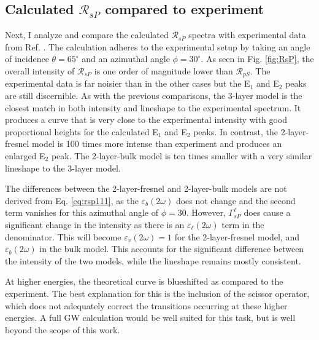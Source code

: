 
\subsection{Calculated \texorpdfstring{$\mathcal{R}_{sP}$}{RsP} compared to 
experiment}\label{sec:1x1RsP}

Next, I analyze and compare the calculated $\mathcal{R}_{sP}$ spectra with
experimental data from Ref. \cite{mejiaPRB02}. The calculation adheres to the
experimental setup by taking an angle of incidence $\theta=65^{\circ}$ and an
azimuthal angle $\phi=30^\circ$. As seen in Fig. \ref{fig:RsP}, the overall
intensity of $\mathcal{R}_{sP}$ is one order of magnitude lower than
$\mathcal{R}_{pS}$. The experimental data is far noisier than in the other cases
but the E$_{1}$ and E$_{2}$ peaks are still discernible. As with the previous
comparisons, the 3-layer model is the closest match in both intensity and
lineshape to the experimental spectrum. It produces a curve that is very close
to the experimental intensity with good proportional heights for the calculated
E$_{1}$ and E$_{2}$ peaks. In contrast, the 2-layer-fresnel model is 100 times
more intense than experiment and produces an enlarged E$_{2}$ peak. The
2-layer-bulk model is ten times smaller with a very similar lineshape to the
3-layer model.

The differences between the 2-layer-fresnel and 2-layer-bulk models are not
derived from Eq. \eqref{eq:rsp111}, as the $\varepsilon_{b}(2\omega)$ does not
change and the second term vanishes for this azimuthal angle of $\phi = 30$.
However, $\Gamma^{\ell}_{sP}$ does cause a significant change in the intensity
as there is an $\varepsilon_{\ell}(2\omega)$ term in the denominator. This will
become $\varepsilon_{v}(2\omega) = 1$ for the 2-layer-fresnel model, and
$\varepsilon_{b}(2\omega)$ in the bulk model. This accounts for the significant
difference between the intensity of the two models, while the lineshape remains
mostly consistent.

At higher energies, the theoretical curve is blueshifted as compared to the
experiment. The best explanation for this is the inclusion of the scissor
operator, which does not adequately correct the transitions occurring at these
higher energies. A full GW calculation would be well suited for this task, but
is well beyond the scope of this work.

